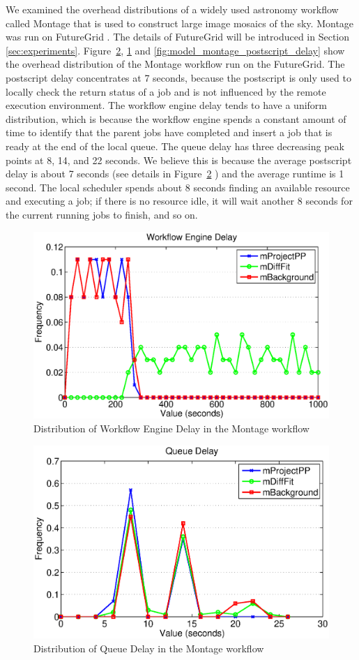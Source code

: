 We examined the overhead distributions of a widely used astronomy workflow called Montage \cite{Berriman2004} that is used to construct large image mosaics of the sky. Montage was run on FutureGrid \cite{Fox2013FutureGrid}. The details of FutureGrid will be introduced in Section \ref{sec:experiments}. 
Figure~\ref{fig:model_montage_queue_delay}, \ref{fig:model_montage_engine_delay} and \ref{fig:model_montage_postscript_delay} show the overhead distribution of the Montage workflow run on the FutureGrid. The postscript delay concentrates at 7 seconds, because the postscript is only used to locally check the return status of a job and is not influenced by the remote execution environment. The workflow engine delay tends to have a uniform distribution, which is because the workflow engine spends a constant amount of time to identify that the parent jobs have completed and insert a job that is ready at the end of the local queue. 
The queue delay has three decreasing peak points at 8, 14, and 22 seconds. We believe this is because the average postscript delay is about 7 seconds (see details in Figure~\ref{fig:model_montage_queue_delay} ) and the average runtime is 1 second. The local scheduler spends about 8 seconds finding an available resource and executing a job; if there is no resource idle, it will wait another 8 seconds for the current running jobs to finish, and so on. 


\begin{figure}[h!]
	\centering
    \includegraphics[height=0.4\textwidth]{figures/model/workflow_engine_delay.eps}
    \caption{Distribution of Workflow Engine Delay in the Montage workflow}
    \label{fig:model_montage_engine_delay}
\end{figure}

\begin{figure}[h!]
	\centering
\includegraphics[height=0.4\textwidth]{figures/model/queue_delay.eps}
    \caption{Distribution of Queue Delay in the Montage workflow}
    \label{fig:model_montage_queue_delay}
\end{figure}

